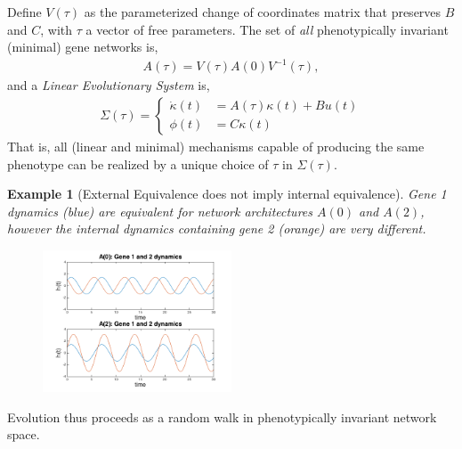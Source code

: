 \documentclass[9 pt]{article}
\newcommand{\1}{\mathbbm{1}}
\newtheorem{example}{Example}
\begin{document}
\begin{multicols}{2}
  Define $V(\tau)$ as the parameterized change of coordinates matrix that preserves $B$ and $C$, with $\tau$ a vector of free parameters. The set of \emph{all} phenotypically invariant (minimal) gene networks is, 
  \begin{align}
    A(\tau) = V(\tau) A(0) V^{-1}(\tau) ,
  \end{align}
  and a \emph{Linear Evolutionary System} is, 
  \begin{align}
    \Sigma(\tau) = \left\{ \begin{array}{ll} \dot{\kappa}(t) &= A(\tau) \kappa(t) + B u(t) \\ \phi(t) &= C \kappa(t) \end{array} \right .
  \end{align}
  That is, all (linear and minimal) mechanisms capable of producing the same phenotype can be realized by a unique choice of $\tau$ in $\Sigma(\tau)$.
  \begin{example}[External Equivalence does not imply internal equivalence]
    Gene 1 dynamics (blue) are equivalent for network architectures $A(0)$ and $A(2)$, however the internal dynamics containing gene 2 (orange) are very different.
  \begin{figure}[H]
    \centering
    \includegraphics[width=0.5\textwidth]{osc_A0_A2_both_compare}
  \end{figure}
  \end{example}
  Evolution thus proceeds as a random walk in phenotypically invariant network space. 


\end{multicols}
\end{document}
